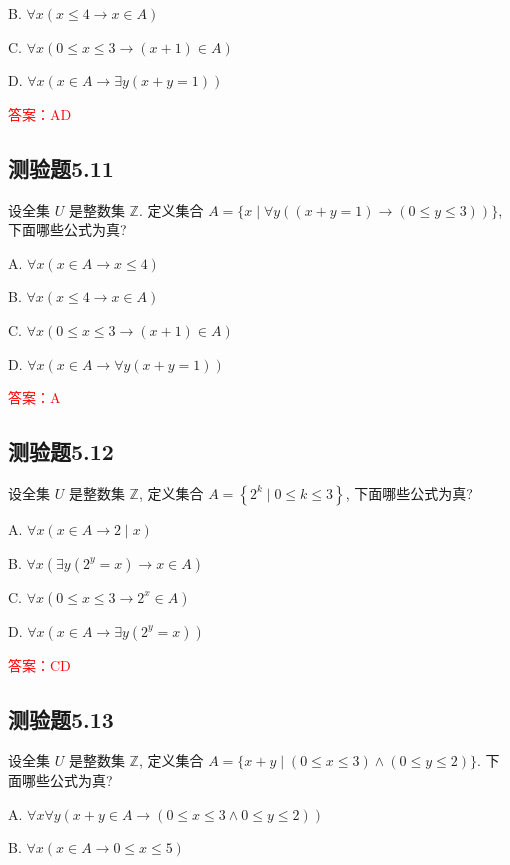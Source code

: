 \documentclass[UTF8, heading=true]{ctexart}
\begin{document}
B. $\forall x(x \leq 4 \rightarrow x \in A)$

C. 
$\forall x(0 \leq x \leq 3 \rightarrow(x+1) \in A)$

D. $\forall x(x \in A \rightarrow \exists y(x+y=1))$

\textcolor{red}{答案：AD}



\subsection{测验题5.11}

设全集 $U$ 是整数集 $\mathbb{Z}$. 定义集合 $A=\{x \mid \forall y((x+y=1) \rightarrow(0 \leq y \leq 3))\}$, 下面哪些公式为真?

A. $\forall x(x \in A \rightarrow x \leq 4)$

B. $\forall x(x \leq 4 \rightarrow x \in A)$

C. $\forall x(0 \leq x \leq 3 \rightarrow(x+1) \in A)$

D. $\forall x(x \in A \rightarrow \forall y(x+y=1))$

\textcolor{red}{答案：A}


\subsection{测验题5.12}

设全集 $U$ 是整数集 $\mathbb{Z}$, 定义集合 $A=\left\{2^k \mid 0 \leq k \leq 3\right\}$, 下面哪些公式为真?

A. $\forall x(x \in A \rightarrow 2 \mid x)$

B. $\forall x\left(\exists y\left(2^y=x\right) \rightarrow x \in A\right)$

C. $\forall x\left(0 \leq x \leq 3 \rightarrow 2^x \in A\right)$

D. $\forall x\left(x \in A \rightarrow \exists y\left(2^y=x\right)\right)$

\textcolor{red}{答案：CD}

\subsection{测验题5.13}

设全集 $U$ 是整数集 $\mathbb{Z}$, 定义集合 $A=\{x+y \mid(0 \leq x \leq 3) \wedge(0 \leq y \leq 2)\}$. 下面哪些公式为真?

A. $\forall x \forall y(x+y \in A \rightarrow(0 \leq x \leq 3 \wedge 0 \leq y \leq 2))$

B. $\forall x(x \in A \rightarrow 0 \leq x \leq 5)$
\end{document}
